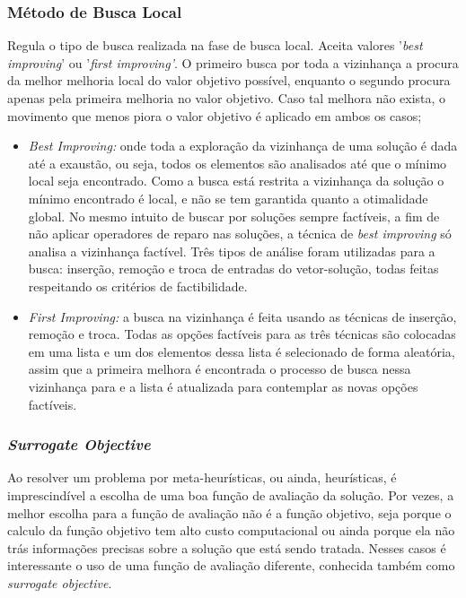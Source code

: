 \documentclass[12pt,a4paper]{article}
\begin{document}
    \subsubsection{Método de Busca Local}

        Regula o tipo de busca realizada na fase de busca local. Aceita valores '\textit{best improving}' ou '\textit{first improving'}. O primeiro busca por toda a vizinhança
        a procura da melhor melhoria local do valor objetivo possível, enquanto o segundo procura apenas pela primeira melhoria no valor objetivo. Caso tal melhora não exista, o movimento que menos
        piora o valor objetivo é aplicado em ambos os casos;

        \begin{itemize}

        \item {\it Best Improving:} onde toda a exploração da vizinhança de uma solução é dada até a exaustão, ou seja, todos os elementos são analisados até que o mínimo local seja encontrado. Como
            a busca está restrita a vizinhança da solução o mínimo encontrado é local, e não se tem garantida quanto a otimalidade global. No mesmo intuito de buscar por soluções sempre factíveis, a
                fim de não aplicar operadores de reparo nas soluções, a técnica de {\it best improving} só analisa a vizinhança factível. Três tipos de análise foram utilizadas para a busca:
                inserção, remoção e troca de entradas do vetor-solução, todas feitas respeitando os critérios de factibilidade. 

        \item {\it First Improving:} a busca na vizinhança é feita usando as técnicas de inserção, remoção e troca. Todas as opções factíveis para as três técnicas são colocadas em uma lista
        e um dos elementos dessa lista é selecionado de forma aleatória, assim que a primeira melhora é encontrada o processo de busca nessa vizinhança para e a lista é atualizada para
        contemplar as novas opções factíveis. 
        \end{itemize}

    \subsubsection{\it Surrogate Objective} 

        Ao resolver um problema por meta-heurísticas, ou ainda, heurísticas, é imprescindível a escolha de uma boa função de avaliação da solução. Por vezes, a melhor escolha para a função de
        avaliação não é a função objetivo, seja porque o calculo da  função objetivo tem alto custo computacional ou ainda porque ela não trás informações precisas sobre a solução que está sendo
        tratada. Nesses casos é interessante o uso de uma função de avaliação diferente, conhecida também como {\it surrogate objective}.
\end{document}
